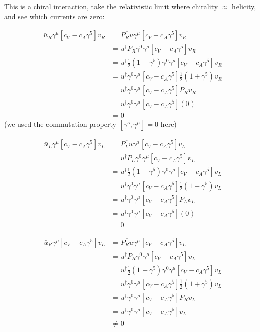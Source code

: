 This is a chiral interaction, take the relativistic limit where chirality $\approx$ helicity, and see which currents are zero:

\begin{align*}
    \bar{u}_R \gamma^\mu [c_V - c_A \gamma^5]v_R &= \overline{P_R u} \gamma^\mu [c_V - c_A \gamma^5]v_R \\
    &= u^\dagger P_R \gamma^0 \gamma^\mu [c_V - c_A \gamma^5]v_R \\
    &= u^\dagger \frac{1}{2}(1 + \gamma^5) \gamma^0 \gamma^\mu [c_V - c_A \gamma^5] v_R \\
    &= u^\dagger \gamma^0 \gamma^\mu [c_V - c_A \gamma^5]\frac{1}{2}(1 + \gamma^5) v_R \\
    &= u^\dagger \gamma^0 \gamma^\mu [c_V - c_A \gamma^5]P_R v_R \\
    &= u^\dagger \gamma^0 \gamma^\mu [c_V - c_A \gamma^5](0) \\
    &= 0
\end{align*}
(we used the commutation property $[\gamma^5, \gamma^\mu] = 0$ here)

\begin{align*}
    \bar{u}_L \gamma^\mu [c_V - c_A \gamma^5]v_L &= \overline{P_L u} \gamma^\mu [c_V - c_A \gamma^5]v_L \\
    &= u^\dagger P_L \gamma^0 \gamma^\mu [c_V - c_A \gamma^5]v_L \\
    &= u^\dagger \frac{1}{2}(1 - \gamma^5) \gamma^0 \gamma^\mu [c_V - c_A \gamma^5] v_L \\
    &= u^\dagger \gamma^0 \gamma^\mu [c_V - c_A \gamma^5]\frac{1}{2}(1 - \gamma^5) v_L \\
    &= u^\dagger \gamma^0 \gamma^\mu [c_V - c_A \gamma^5]P_L v_L \\
    &= u^\dagger \gamma^0 \gamma^\mu [c_V - c_A \gamma^5](0) \\
    &= 0
\end{align*}


\begin{align*}
    \bar{u}_R \gamma^\mu [c_V - c_A \gamma^5]v_L &= \overline{P_R u} \gamma^\mu [c_V - c_A \gamma^5]v_L \\
    &= u^\dagger P_R \gamma^0 \gamma^\mu [c_V - c_A \gamma^5]v_L \\
    &= u^\dagger \frac{1}{2}(1 + \gamma^5) \gamma^0 \gamma^\mu [c_V - c_A \gamma^5] v_L \\
    &= u^\dagger \gamma^0 \gamma^\mu [c_V - c_A \gamma^5]\frac{1}{2}(1 + \gamma^5) v_L \\
    &= u^\dagger \gamma^0 \gamma^\mu [c_V - c_A \gamma^5]P_R v_L \\
    &= u^\dagger \gamma^0 \gamma^\mu [c_V - c_A \gamma^5]v_L \\
    &\neq 0
\end{align*}

